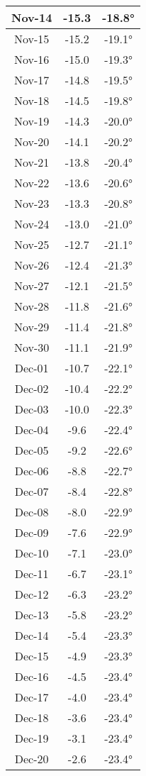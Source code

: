 \begin{footnotesize}
\begin{minipage}{0.33\textwidth}
\begin{tabular}[t]{c | c | c}
Nov-14 & -15.3 & -18.8°\\\hline
Nov-15 & -15.2 & -19.1°\\\hline
Nov-16 & -15.0 & -19.3°\\\hline
Nov-17 & -14.8 & -19.5°\\\hline
Nov-18 & -14.5 & -19.8°\\\hline
Nov-19 & -14.3 & -20.0°\\\hline
Nov-20 & -14.1 & -20.2°\\\hline
Nov-21 & -13.8 & -20.4°\\\hline
Nov-22 & -13.6 & -20.6°\\\hline
Nov-23 & -13.3 & -20.8°\\\hline
Nov-24 & -13.0 & -21.0°\\\hline
Nov-25 & -12.7 & -21.1°\\\hline
Nov-26 & -12.4 & -21.3°\\\hline
Nov-27 & -12.1 & -21.5°\\\hline
Nov-28 & -11.8 & -21.6°\\\hline
Nov-29 & -11.4 & -21.8°\\\hline
Nov-30 & -11.1 & -21.9°\\\hline
Dec-01 & -10.7 & -22.1°\\\hline
Dec-02 & -10.4 & -22.2°\\\hline
Dec-03 & -10.0 & -22.3°\\\hline
Dec-04 & -9.6 & -22.4°\\\hline
Dec-05 & -9.2 & -22.6°\\\hline
Dec-06 & -8.8 & -22.7°\\\hline
Dec-07 & -8.4 & -22.8°\\\hline
Dec-08 & -8.0 & -22.9°\\\hline
Dec-09 & -7.6 & -22.9°\\\hline
Dec-10 & -7.1 & -23.0°\\\hline
Dec-11 & -6.7 & -23.1°\\\hline
Dec-12 & -6.3 & -23.2°\\\hline
Dec-13 & -5.8 & -23.2°\\\hline
Dec-14 & -5.4 & -23.3°\\\hline
Dec-15 & -4.9 & -23.3°\\\hline
Dec-16 & -4.5 & -23.4°\\\hline
Dec-17 & -4.0 & -23.4°\\\hline
Dec-18 & -3.6 & -23.4°\\\hline
Dec-19 & -3.1 & -23.4°\\\hline
Dec-20 & -2.6 & -23.4°\\\hline

\end{tabular}
\end{minipage}
\end{footnotesize}

